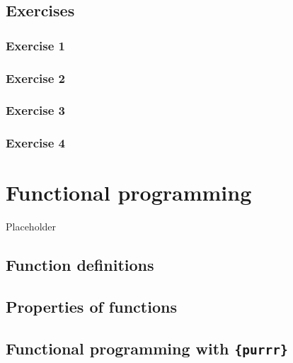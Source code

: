 \documentclass[]{gitbook}
\begin{document}
\hypertarget{exercises-4}{%
\subsection{Exercises}\label{exercises-4}}

\hypertarget{exercise-1-4}{%
\subsubsection*{Exercise 1}\label{exercise-1-4}}

\hypertarget{exercise-2-2}{%
\subsubsection*{Exercise 2}\label{exercise-2-2}}

\hypertarget{exercise-3-2}{%
\subsubsection*{Exercise 3}\label{exercise-3-2}}

\hypertarget{exercise-4-1}{%
\subsubsection*{Exercise 4}\label{exercise-4-1}}

\hypertarget{functional-programming}{%
\section{Functional programming}\label{functional-programming}}

Placeholder

\hypertarget{function-definitions}{%
\subsection{Function definitions}\label{function-definitions}}

\hypertarget{properties-of-functions}{%
\subsection{Properties of functions}\label{properties-of-functions}}

\hypertarget{functional-programming-with-purrr}{%
\subsection{\texorpdfstring{Functional programming with \texttt{\{purrr\}}}{Functional programming with \{purrr\}}}\label{functional-programming-with-purrr}}
\end{document}
